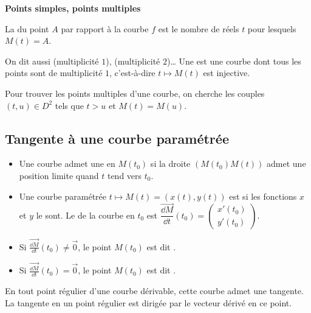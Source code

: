\documentclass[10pt,class=article,crop=false]{standalone}
\begin{document}
\begin{multicols}{2}
\textbf{Points simples, points multiples}


La  du point $A$ par rapport à la courbe $f$ est le nombre de réels $t$ pour lesquels $M(t)=A$.



On dit aussi  (multiplicité $1$),  (multiplicité $2$)\ldots{}  
Une  est une courbe dont tous les points sont de multiplicité $1$, c'est-à-dire $t\mapsto M(t)$ est injective.

Pour trouver les points multiples d'une courbe, 
on cherche les couples $(t,u)\in D^2$ tels que $t>u$ et 
$M(t)=M(u)$.


\subsection{Tangente à une courbe paramétrée}


\begin{itemize}
	\item Une courbe admet une  en $M(t_0)$ si la droite $(M(t_0)M(t))$
	admet une position limite quand $t$ tend vers $t_0$.
	
	
	
	
	\item Une courbe paramétrée $t\mapsto M(t)=(x(t),y(t))$ 
	est  si les fonctions $x$ et $y$ le sont. 
	Le  de la courbe en $t_0$ est
	$\overrightarrow{\dfrac{\dd M}{\dd t}}(t_0) = 
	\left(
	\begin{matrix}
		x'(t_0)\\
		y'(t_0)
	\end{matrix}
	\right)$.
	
	\item Si $\overrightarrow{\frac{\dd M}{\dd t}}(t_0)\neq\vec{0}$,
	le point $M(t_0)$ est dit .
	
	\item Si $\overrightarrow{\frac{\dd M}{\dd t}}(t_0)=\vec{0}$,
	le point $M(t_0)$ est dit .
\end{itemize}

\begin{theoreme}
	En tout point régulier d'une courbe dérivable, cette courbe admet une tangente.
	La tangente en un point régulier est dirigée par le vecteur dérivé en ce point.
\end{theoreme}


\end{multicols}
\end{document}
